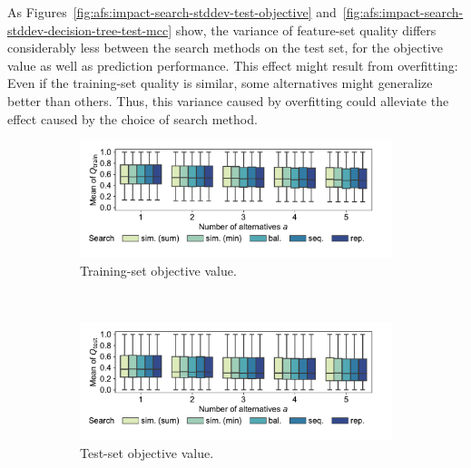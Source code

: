 \documentclass{article}
\theoremstyle{definition}
\begin{document}
As Figures~\ref{fig:afs:impact-search-stddev-test-objective} and~\ref{fig:afs:impact-search-stddev-decision-tree-test-mcc} show, the variance of feature-set quality differs considerably less between the search methods on the test set, for the objective value as well as prediction performance.
This effect might result from overfitting:
Even if the training-set quality is similar, some alternatives might generalize better than others.
Thus, this variance caused by overfitting could alleviate the effect caused by the choice of search method.

\begin{figure}[p]
	\centering
	\begin{subfigure}[t]{\textwidth}
		\centering
		\includegraphics[width=\textwidth, trim=15 25 35 15, clip]{plots/afs-impact-search-mean-train-objective.pdf}
		\caption{Training-set objective value.}
		\label{fig:afs:impact-search-mean-train-objective}
	\end{subfigure}
	\\ \vspace{\baselineskip}
	\begin{subfigure}[t]{\textwidth}
		\centering
		\includegraphics[width=\textwidth, trim=15 25 35 15, clip]{plots/afs-impact-search-mean-test-objective.pdf}
		\caption{Test-set objective value.}
		\label{fig:afs:impact-search-mean-test-objective}
	\end{subfigure}
	\\ \vspace{\baselineskip}
	\begin{subfigure}[t]{\textwidth}

\end{subfigure}
\end{figure}
\end{document}
